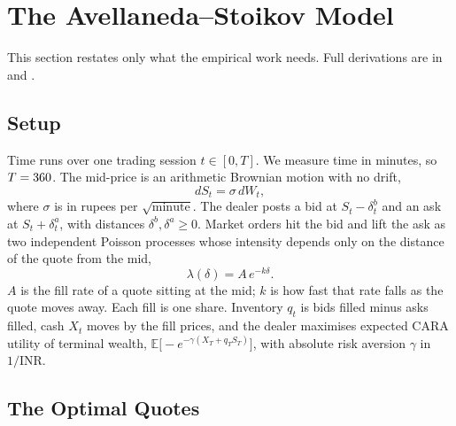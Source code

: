 \section{The Avellaneda--Stoikov Model}
\label{sec:model}

This section restates only what the empirical work needs. Full derivations are in
\cite{avellaneda2008} and \cite{amargos2026}.

\subsection{Setup}

Time runs over one trading session $t\in[0,T]$. We measure time in minutes, so $T=360$.
The mid-price is an arithmetic Brownian motion with no drift,
\begin{equation}
dS_t = \sigma\, dW_t ,
\label{eq:mid}
\end{equation}
where $\sigma$ is in rupees per $\sqrt{\text{minute}}$. The dealer posts a bid at $S_t-\delta^b_t$
and an ask at $S_t+\delta^a_t$, with distances $\delta^b,\delta^a\ge 0$. Market orders hit the
bid and lift the ask as two independent Poisson processes whose intensity depends only on the
distance of the quote from the mid,
\begin{equation}
\lambda(\delta) = A\,e^{-k\delta}.
\label{eq:lambda}
\end{equation}
$A$ is the fill rate of a quote sitting at the mid; $k$ is how fast that rate falls as the quote
moves away. Each fill is one share. Inventory $q_t$ is bids filled minus asks filled, cash $X_t$
moves by the fill prices, and the dealer maximises expected CARA utility of terminal wealth,
$\mathbb{E}\big[-e^{-\gamma(X_T+q_TS_T)}\big]$, with absolute risk aversion $\gamma$ in $1/\text{INR}$.

\subsection{The Optimal Quotes}

